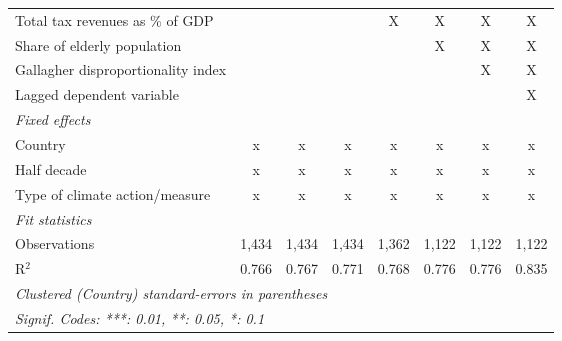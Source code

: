 \begin{table}[htbp]
\begin{tabular}{lccccccc}
      Total tax revenues as \% of GDP                                                           &         &         &              & X       & X            & X            & X\\  
      Share of elderly population                                                               &         &         &              &         & X            & X            & X\\  
      Gallagher disproportionality index                                                        &         &         &              &         &              & X            & X\\  
      Lagged dependent variable                                                                 &         &         &              &         &              &              & X\\  
      \emph{Fixed effects}\\
      Country                                                                                   & x       & x       & x            & x       & x            & x            & x\\  
      Half decade                                                                               & x       & x       & x            & x       & x            & x            & x\\  
      Type of climate action/measure                                                            & x       & x       & x            & x       & x            & x            & x\\  
      \midrule \emph{Fit statistics}\\
      Observations                                                                              & 1,434   & 1,434   & 1,434        & 1,362   & 1,122        & 1,122        & 1,122\\  
      R$^2$                                                                                     & 0.766   & 0.767   & 0.771        & 0.768   & 0.776        & 0.776        & 0.835\\  
      \midrule
      \multicolumn{8}{l}{\emph{Clustered (Country) standard-errors in parentheses}}\\
      \multicolumn{8}{l}{\emph{Signif. Codes: ***: 0.01, **: 0.05, *: 0.1}}\\
   \end{tabular}
\end{table}


